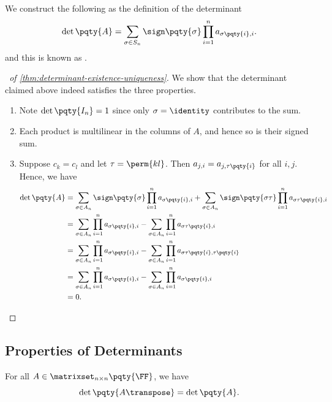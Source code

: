 We construct the following as the definition of the determinant
\[
    \det\pqty{A} = \sum_{\sigma \in S_n} \sign\pqty{\sigma} \prod_{i=1}^{n} a_{\sigma\pqty{i}, i}.
\]
and this is known as .

\begin{proof}[\proofname\ of \autoref{thm:determinant-existence-uniqueness}]
     We show that the determinant claimed above indeed satisfies the three properties.

    \begin{enumerate}[label=(\roman*)]
        \item[(iii)]  Note \(\det\pqty{I_n} = 1\) since only \(\sigma = \identity\) contributes to the sum.
        \item[(ii)]  Each product is multilinear in the columns of \(A\), and hence so is their signed sum.
        \item[(i)]  Suppose \(c_k = c_l\) and let \(\tau = \perm{k l}\). Then \(a_{j, i} = a_{j, \tau\pqty{i}}\) for all \(i, j\). Hence, we have
        \begin{align*}
            \det\pqty{A} &= \sum_{\sigma \in A_n} \sign\pqty{\sigma} \prod_{i=1}^{n} a_{\sigma\pqty{i}, i} + \sum_{\sigma \in A_n} \sign\pqty{\sigma \tau} \prod_{i=1}^{n} a_{\sigma \tau\pqty{i}, i} \\
            &= \sum_{\sigma \in A_n} \prod_{i=1}^{n} a_{\sigma\pqty{i}, i} - \sum_{\sigma \in A_n} \prod_{i=1}^{n} a_{\sigma\tau\pqty{i}, i} \\
            &= \sum_{\sigma \in A_n} \prod_{i=1}^{n} a_{\sigma\pqty{i}, i} - \sum_{\sigma \in A_n} \prod_{i=1}^{n} a_{\sigma\tau \pqty{i}, \tau \pqty{i}} \\
            &= \sum_{\sigma \in A_n} \prod_{i=1}^{n} a_{\sigma\pqty{i}, i} - \sum_{\sigma \in A_n} \prod_{i=1}^{n} a_{\sigma \pqty{i}, i} \\
            &= 0.
        \end{align*}
    \end{enumerate}
\end{proof}

\subsection{Properties of Determinants}

\begin{lemma}
    For all \(A \in \matrixset_{n \times n} \pqty{\FF}\), we have
    \[
        \det\pqty{A\transpose} = \det\pqty{A}.
    \]
\end{lemma}

